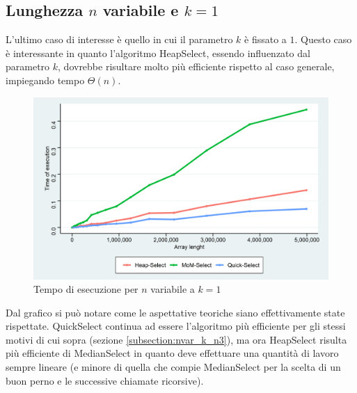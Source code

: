 \documentclass{article}
\begin{document}
	\newpage
	
	
	\subsection{Lunghezza $n$ variabile e $k=1$}
	L'ultimo caso di interesse è quello in cui il parametro $k$ è fissato a $1$. Questo caso è interessante in quanto l'algoritmo HeapSelect, essendo influenzato dal parametro $k$, dovrebbe risultare molto più efficiente rispetto al caso generale, impiegando tempo $\Theta\left(n\right)$.
	
	\begin{figure}[h!]
  		\includegraphics[width=\linewidth]{images/Grafico_Con_K1.png}
  		\caption{Tempo di esecuzione per $n$ variabile a $k=1$}
  		\label{fig:graph6}
	\end{figure}
	
	Dal grafico si può notare come le aspettative teoriche siano effettivamente state rispettate. QuickSelect continua ad essere l'algoritmo più efficiente per gli stessi motivi di cui sopra (sezione \ref{subsection:nvar_k_n3}), ma ora HeapSelect risulta più efficiente di MedianSelect in quanto deve effettuare una quantità di lavoro sempre lineare (e minore di quella che compie MedianSelect per la scelta di un buon perno e le successive chiamate ricorsive).
		
	\newpage
\end{document}
